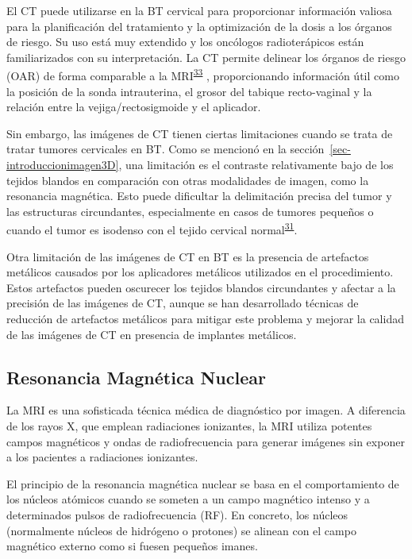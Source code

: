 \documentclass[
  a4paper,
]{scrreprt}
\begin{document}
El CT puede utilizarse en la BT cervical para proporcionar información
valiosa para la planificación del tratamiento y la optimización de la
dosis a los órganos de riesgo. Su uso está muy extendido y los oncólogos
radioterápicos están familiarizados con su interpretación. La CT permite
delinear los órganos de riesgo (OAR) de forma comparable a la
MRI\textsuperscript{\protect\hyperlink{ref-viswanathan2007}{33}} ,
proporcionando información útil como la posición de la sonda
intrauterina, el grosor del tabique recto-vaginal y la relación entre la
vejiga/rectosigmoide y el aplicador.

Sin embargo, las imágenes de CT tienen ciertas limitaciones cuando se
trata de tratar tumores cervicales en BT. Como se mencionó en la
sección~\ref{sec-introduccionimagen3D}, una limitación es el contraste
relativamente bajo de los tejidos blandos en comparación con otras
modalidades de imagen, como la resonancia magnética. Esto puede
dificultar la delimitación precisa del tumor y las estructuras
circundantes, especialmente en casos de tumores pequeños o cuando el
tumor es isodenso con el tejido cervical
normal\textsuperscript{\protect\hyperlink{ref-uxf6zsarlak2003}{31}}.

Otra limitación de las imágenes de CT en BT es la presencia de
artefactos metálicos causados por los aplicadores metálicos utilizados
en el procedimiento. Estos artefactos pueden oscurecer los tejidos
blandos circundantes y afectar a la precisión de las imágenes de CT,
aunque se han desarrollado técnicas de reducción de artefactos metálicos
para mitigar este problema y mejorar la calidad de las imágenes de CT en
presencia de implantes metálicos.

\hypertarget{resonancia-magnuxe9tica-nuclear}{%
\subsection{Resonancia Magnética
Nuclear}\label{resonancia-magnuxe9tica-nuclear}}

La MRI es una sofisticada técnica médica de diagnóstico por imagen. A
diferencia de los rayos X, que emplean radiaciones ionizantes, la MRI
utiliza potentes campos magnéticos y ondas de radiofrecuencia para
generar imágenes sin exponer a los pacientes a radiaciones ionizantes.

El principio de la resonancia magnética nuclear se basa en el
comportamiento de los núcleos atómicos cuando se someten a un campo
magnético intenso y a determinados pulsos de radiofrecuencia (RF). En
concreto, los núcleos (normalmente núcleos de hidrógeno o protones) se
alinean con el campo magnético externo como si fuesen pequeños imanes.
\end{document}
